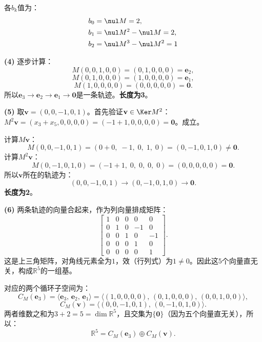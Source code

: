 \documentclass[12pt,UTF8]{ctexbook}
\begin{document}
\begin{so}
各$b_k$值为：
\begin{align*}
    b_0 &= \nul M = 2, \\
    b_1 &= \nul M^2 - \nul M = 2, \\
    b_2 &= \nul M^3 - \nul M^2 = 1
\end{align*}

\textbf{(4)} 逐步计算：
$$M(0,0,1,0,0) = (0,1,0,0,0) = \mathbf{e}_2,$$
$$M(0,1,0,0,0) = (1,0,0,0,0) = \mathbf{e}_1,$$
$$M(1,0,0,0,0) = (0,0,0,0,0) = \mathbf{0}.$$
所以$\mathbf{e}_3 \to \mathbf{e}_2 \to \mathbf{e}_1 \to \mathbf{0}$是一条轨迹。\textbf{长度为3}。

\textbf{(5)} 取$\mathbf{v} = (0,0,-1,0,1)$。首先验证$\mathbf{v} \in \Ker M^2$：
$M^2\mathbf{v} = (x_3+x_5, 0, 0, 0, 0) = (-1+1, 0, 0, 0, 0) = \mathbf{0}$。成立。

计算$M\mathbf{v}$：
$$M(0,0,-1,0,1) = (0+0,\; -1,\; 0,\; 1,\; 0) = (0,-1,0,1,0) \neq \mathbf{0}.$$
计算$M^2\mathbf{v}$：
$$M(0,-1,0,1,0) = (-1+1,\; 0,\; 0,\; 0,\; 0) = (0,0,0,0,0) = \mathbf{0}.$$
所以$\mathbf{v}$所在的轨迹为：
$$(0,0,-1,0,1) \longrightarrow (0,-1,0,1,0) \longrightarrow \mathbf{0}.$$
\textbf{长度为2}。

\textbf{(6)} 两条轨迹的向量合起来，作为列向量排成矩阵：
$$\begin{bmatrix} 1 & 0 & 0 & 0 & 0 \\ 0 & 1 & 0 & -1 & 0 \\ 0 & 0 & 1 & 0 & -1 \\ 0 & 0 & 0 & 1 & 0 \\ 0 & 0 & 0 & 0 & 1 \end{bmatrix}.$$
这是上三角矩阵，对角线元素全为$1$，效（行列式）为$1 \neq 0$。因此这$5$个向量直无关，构成$\mathbb{R}^5$的一组基。

对应的两个循环子空间为：
$$C_M(\mathbf{e}_3) = \langle \mathbf{e}_3,\, \mathbf{e}_2,\, \mathbf{e}_1 \rangle = \langle (1,0,0,0,0),\, (0,1,0,0,0),\, (0,0,1,0,0)\rangle,$$
$$C_M(\mathbf{v}) = \langle (0,0,-1,0,1),\, (0,-1,0,1,0)\rangle.$$
两者维数之和为$3+2=5=\dim\mathbb{R}^5$，且交集为$\{\mathbf{0}\}$（因为五个向量直无关），所以：
$$\mathbb{R}^5 = C_M(\mathbf{e}_3) \oplus C_M(\mathbf{v}).$$
\end{so}


\end{document}
